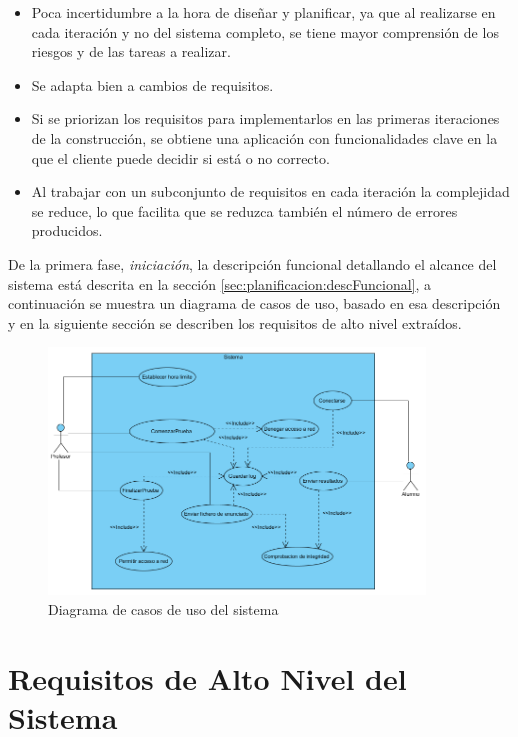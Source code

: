\begin{itemize}

	\item[\ding{70}] Poca incertidumbre a la hora de diseñar y planificar, ya que al realizarse en cada iteración y no del sistema completo, se tiene mayor comprensión de los riesgos y de las tareas a realizar.

	\item[\ding{70}] Se adapta bien a cambios de requisitos.

	\item[\ding{70}] Si se priorizan los requisitos para implementarlos en las primeras iteraciones de la construcción, se obtiene una aplicación con funcionalidades clave en la que el cliente puede decidir si está o no correcto.

	\item[\ding{70}] Al trabajar con un subconjunto de requisitos en cada iteración la complejidad se reduce, lo que facilita que se reduzca también el número de errores producidos.

\end{itemize}

De la primera fase, \emph{iniciación}, la descripción funcional detallando el alcance del sistema está descrita en la sección \ref{sec:planificacion:descFuncional}, a continuación se muestra un diagrama de casos de uso, basado en esa descripción y en la siguiente sección se describen los requisitos de alto nivel extraídos.

\begin{figure}
    \centering
    \includegraphics[width=10cm]{planificacion/casosUsoSistema}
    \caption{Diagrama de casos de uso del sistema}
    \label{fig:planificacion:casosUso}
\end{figure}



\section{Requisitos de Alto Nivel del Sistema}
\label{sec:planificacion:requisitos}

